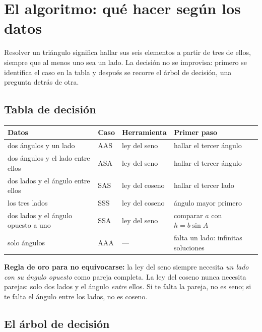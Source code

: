 \documentclass[12pt, letterpaper]{article}
\providecommand{\sen}{\sin}
\begin{document}
\section{El algoritmo: qué hacer según los datos}

Resolver un triángulo significa hallar sus seis elementos a partir de tres
de ellos, siempre que al menos uno sea un lado. La decisión no se improvisa:
primero se identifica el caso en la tabla y después se recorre el árbol de
decisión, una pregunta detrás de otra.


\subsection*{Tabla de decisión}

\begin{center}
\small
\begin{tabular}{@{}l l l p{5.6cm}@{}}
  \toprule
  \textbf{Datos} & \textbf{Caso} & \textbf{Herramienta} & \textbf{Primer paso} \\
  \midrule
  dos ángulos y un lado & AAS & ley del seno & hallar el tercer ángulo \\
  dos ángulos y el lado entre ellos & ASA & ley del seno & hallar el tercer ángulo \\
  dos lados y el ángulo entre ellos & SAS & ley del coseno & hallar el tercer lado \\
  los tres lados & SSS & ley del coseno & ángulo mayor primero \\
  dos lados y el ángulo opuesto a uno & SSA & ley del seno & comparar $a$ con $h=b\sen A$ \\
  solo ángulos & AAA & --- & falta un lado: infinitas soluciones \\
  \bottomrule
\end{tabular}
\end{center}

\begin{cuadroextra}
  \small
  \textbf{Regla de oro para no equivocarse:} la ley del seno siempre necesita
  \emph{un lado con su ángulo opuesto} como pareja completa. La ley del coseno
  nunca necesita parejas: solo dos lados y el ángulo \emph{entre} ellos.
  Si te falta la pareja, no es seno; si te falta el ángulo entre los lados,
  no es coseno.
\end{cuadroextra}

\subsection*{El árbol de decisión}
\end{document}
